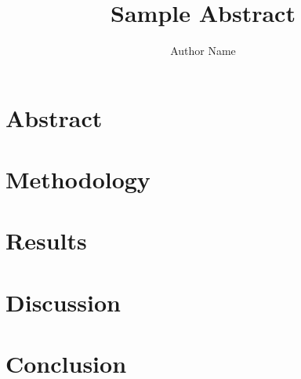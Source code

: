 \documentclass[a4paper,11pt,twocolumn]{article}
\begin{document}
\title{Sample Abstract}
\author{Author Name}
\date{} %
\maketitle
\vspace{0.5cm}

\section*{Abstract}

\lipsum[1]
 \section{Methodology}
 \lipsum[1]
 \section{Results}
 \lipsum[1]
 \section{Discussion}
 \lipsum[1]
 \section{Conclusion}
 \lipsum[1]

 
\end{document}
